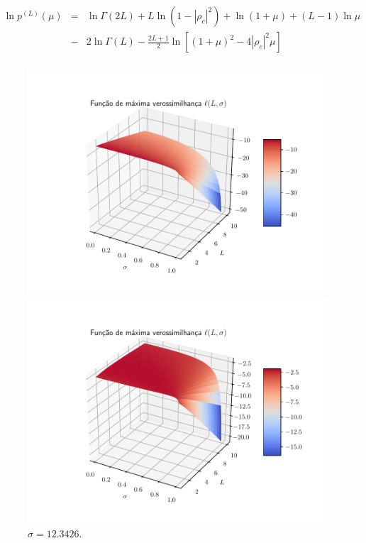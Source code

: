 \documentclass[journal,article,submit,moreauthors,pdftex]{Definitions/mdpi}
\begin{document}
\begin{equation}\label{eqn64}
\begin{array}{ccl}
	\ln p^{(L)}(\mu)&=&\ln\Gamma(2L) +L\ln(1-|\rho_c|^2)+\ln(1+\mu)+(L-1)\ln\mu\\
	&-&2\ln\Gamma(L)-\frac{2L+1}{2}\ln\left[(1+\mu)^2-4|\rho_c|^2\mu \right]\\
\end{array}
\end{equation}

\begin{figure}[hbt]
  \includegraphics[width=\linewidth]{funv_max_ver_j_10_flev_razao.pdf}
  	\caption{$\sigma= 12.3426$.}\label{cap_acf_fig04}
\endminipage\hfill
{}
  \includegraphics[width=\linewidth]{funv_max_ver_j_20_flev_razao.pdf}

\end{figure}
\end{document}
